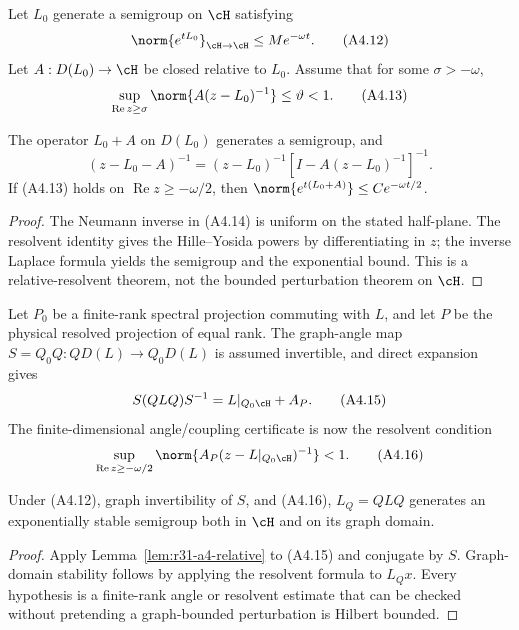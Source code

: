 Let $L_0$ generate a semigroup on $\cH$ satisfying
\[
 \norm{e^{tL_0}}_{\cH\to\cH}\le Me^{-\omega t}.            \tag{A4.12}
\]
Let $A:D(L_0)\to\cH$ be closed relative to $L_0$.  Assume that for some
$\sigma> -\omega$,
\[
 \sup_{\operatorname{Re}z\ge\sigma}
 \norm{A(z-L_0)^{-1}}\le\vartheta<1.                      \tag{A4.13}
\]

\begin{lemma}
\label{lem:r31-a4-relative}
The operator $L_0+A$ on $D(L_0)$ generates a semigroup, and
\[
 (z-L_0-A)^{-1}=(z-L_0)^{-1}
 [I-A(z-L_0)^{-1}]^{-1}.                                  \tag{A4.14}
\]
If (A4.13) holds on $\operatorname{Re}z\ge-\omega/2$, then
$\norm{e^{t(L_0+A)}}\le C e^{-\omega t/2}$.
\end{lemma}

\begin{proof}
The Neumann inverse in (A4.14) is uniform on the stated half-plane.  The
resolvent identity gives the Hille--Yosida powers by differentiating in $z$;
the inverse Laplace formula yields the semigroup and the exponential bound.
This is a relative-resolvent theorem, not the bounded perturbation theorem on
$\cH$.
\end{proof}

Let $P_0$ be a finite-rank spectral projection commuting with $L$, and let
$P$ be the physical resolved projection of equal rank.  The graph-angle map
$S=Q_0Q:Q D(L)\to Q_0D(L)$ is assumed invertible, and direct expansion gives
\[
 S(QLQ)S^{-1}=L|_{Q_0\cH}+A_P.                            \tag{A4.15}
\]
The finite-dimensional angle/coupling certificate is now the resolvent
condition
\[
 \sup_{\operatorname{Re}z\ge-\omega/2}
 \norm{A_P(z-L|_{Q_0\cH})^{-1}}<1.                        \tag{A4.16}
\]

\begin{theorem}
\label{thm:r31-a4-compression}
Under (A4.12), graph invertibility of $S$, and (A4.16),
$L_Q=QLQ$ generates an exponentially stable semigroup both in $\cH$ and on
its graph domain.
\end{theorem}

\begin{proof}
Apply Lemma~\ref{lem:r31-a4-relative} to (A4.15) and conjugate by $S$.
Graph-domain stability follows by applying the resolvent formula to $L_Qx$.
Every hypothesis is a finite-rank angle or resolvent estimate that can be
checked without pretending a graph-bounded perturbation is Hilbert bounded.
\end{proof}

